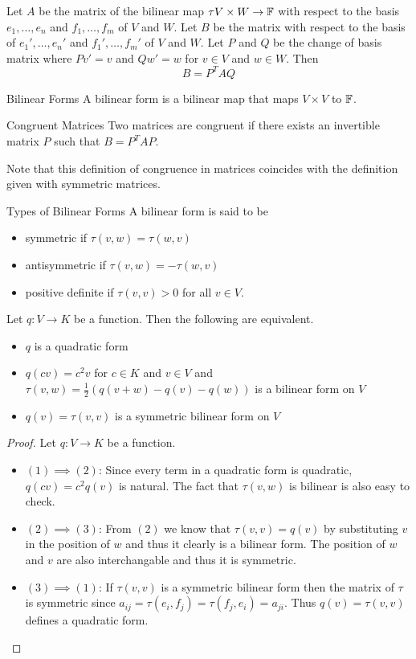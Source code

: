 \documentclass[a4paper]{article}
\begin{document}
\begin{prp}{}{} Let $A$ be the matrix of the bilinear map $\tau V\times W\to\mathbb{F}$ with respect to the basis $e_1,\dots,e_n$ and $f_1,\dots,f_m$ of $V$ and $W$. Let $B$ be the matrix with respect to the basis of $e_1',\dots,e_n'$ and $f_1',\dots,f_m'$ of $V$ and $W$. Let $P$ and $Q$ be the change of basis matrix where $Pv'=v$ and $Qw'=w$ for $v\in V$ and $w\in W$. Then $$B=P^TAQ$$
\end{prp}

\begin{defn}{Bilinear Forms}{} A bilinear form is a bilinear map that maps $V\times V$ to $\mathbb{F}$. 
\end{defn}

\begin{defn}{Congruent Matrices}{} Two matrices are congruent if there exists an invertible matrix $P$ such that $B=P^TAP$. 
\end{defn}
Note that this definition of congruence in matrices coincides with the definition given with symmetric matrices. 

\begin{defn}{Types of Bilinear Forms}{} A bilinear form is said to be
\begin{itemize}
\item symmetric if $\tau(v,w)=\tau(w,v)$
\item antisymmetric if $\tau(v,w)=-\tau(w,v)$
\item positive definite if $\tau(v,v)>0$ for all $v\in V$. 
\end{itemize}
\end{defn}

\begin{prp}{}{} Let $q:V\to K$ be a function. Then the following are equivalent. 
\begin{itemize}
\item $q$ is a quadratic form
\item $q(cv)=c^2v$ for $c\in K$ and $v\in V$ and $\tau(v,w)=\frac{1}{2}(q(v+w)-q(v)-q(w))$ is a bilinear form on $V$
\item $q(v)=\tau(v,v)$ is a symmetric bilinear form on $V$
\end{itemize} \tcbline
\begin{proof}
Let $q:V\to K$ be a function. 
\begin{itemize}
\item $(1)\implies (2)$: Since every term in a quadratic form is quadratic, $q(cv)=c^2q(v)$ is natural. The fact that $\tau(v,w)$ is bilinear is also easy to check. 
\item $(2)\implies (3)$: From $(2)$ we know that $\tau(v,v)=q(v)$ by substituting $v$ in the position of $w$ and thus it clearly is a bilinear form. The position of $w$ and $v$ are also interchangable and thus it is symmetric. 
\item $(3)\implies (1)$: If $\tau(v,v)$ is a symmetric bilinear form then the matrix of $\tau$ is symmetric since $a_{ij}=\tau(e_i,f_j)=\tau(f_j,e_i)=a_{ji}$. Thus $q(v)=\tau(v,v)$ defines a quadratic form. 
\end{itemize}
\end{proof}
\end{prp}
\end{document}

